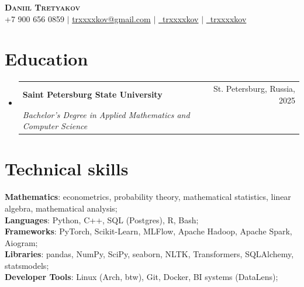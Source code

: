 \documentclass[a4paper, 11pt]{article}
\makeatletter
\newcommand{\resumeSubheading}[4]{
  \vspace{-2pt}\item
    \begin{tabular*}{0.97\textwidth}[t]{l@{\extracolsep{\fill}}r}
      \textbf{#1} & #2 \\
      \textit{\small#3} & \textit{\small #4} \\
    \end{tabular*}\vspace{-7pt}
}
\newcommand{\resumeSubHeadingListStart}{\begin{itemize}[leftmargin=0.15in, label={}]}
\newcommand{\resumeSubHeadingListEnd}{\end{itemize}}
\makeatother
\begin{document}
\begin{center}
    \textbf{\Huge \scshape Daniil Tretyakov} \\ \vspace{5pt}
    \small +7 900 656 0859 $|$ \href{mailto:trxxxxkov@gmail.com}{trxxxxkov@gmail.com} $|$ 
    \href{https://t.me/trxxxxkov}{\faTelegram \ trxxxxkov} $|$
    \href{https://github.com/trxxxxkov}{\faGithub \ trxxxxkov}
\end{center}


\section{Education}
  \resumeSubHeadingListStart
    \resumeSubheading
      {Saint Petersburg State University}{St. Petersburg, Russia, 2025}
      {Bachelor's Degree in Applied Mathematics and Computer Science}
      {}
  \resumeSubHeadingListEnd


\section{Technical skills}
 \begin{itemize}[leftmargin=0.15in, label={}]
    \small{\item{
        \textbf{Mathematics}{: econometrics, probability theory, mathematical statistics, linear algebra, mathematical analysis;} \\    
        \vspace{3pt}
        \textbf{Languages}{: Python, C++, SQL (Postgres), R, Bash;} \\
        \vspace{3pt}
        \textbf{Frameworks}{: PyTorch, Scikit-Learn, MLFlow, Apache Hadoop, Apache Spark, Aiogram;} \\
        \vspace{3pt}
        \textbf{Libraries}{: pandas, NumPy, SciPy, seaborn, NLTK, Transformers, SQLAlchemy, statsmodels;} \\
        \vspace{3pt}
        \textbf{Developer Tools}{: Linux (Arch, btw), Git, Docker, BI systems (DataLens);} \\
    }}
 \end{itemize}

\end{document}
